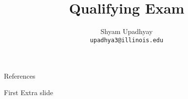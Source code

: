 

\author{Shyam Upadhyay \\ {\tt upadhya3@illinois.edu}}
\title{Qualifying Exam}

\date{} 



\begin{frame}
\titlepage
\end{frame}





\begin{frame}[allowframebreaks]{References}
\def\newblock{}


\end{frame}
\appendix
\begin{frame}{First Extra slide}
\end{frame}

